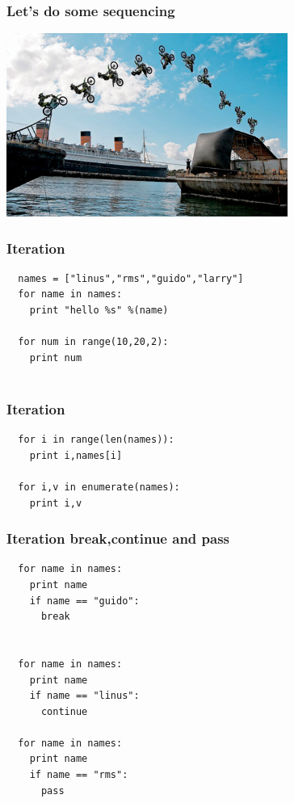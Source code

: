 \documentclass{beamer}
\begin{document}
\begin{frame}[fragile]
 \frametitle{Let's do some sequencing}
 \begin{center}
  \includegraphics[height=6cm]{seq.jpg}
 \end{center}

\end{frame}


\begin{frame}[fragile]
 \frametitle{Iteration}
 \begin{verbatim}
  names = ["linus","rms","guido","larry"]
  for name in names:
    print "hello %s" %(name)
  
  for num in range(10,20,2):
    print num
   
 \end{verbatim}

\end{frame}

\begin{frame}[fragile]
 \frametitle{Iteration}
 \begin{verbatim}
  for i in range(len(names)):
    print i,names[i]
  
  for i,v in enumerate(names):
    print i,v
 \end{verbatim}

\end{frame}

\begin{frame}[fragile]
 \frametitle{Iteration break,continue and pass}
 \begin{verbatim}
  for name in names:
    print name
    if name == "guido":
      break
  
  
  for name in names:
    print name
    if name == "linus":
      continue
  
  for name in names:
    print name
    if name == "rms":
      pass
 \end{verbatim}

\end{frame}
\end{document}

